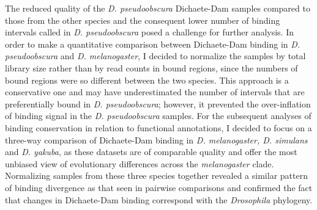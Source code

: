 The reduced quality of the \emph{D. pseudoobscura} Dichaete-Dam samples compared to those from the other species and the consequent lower number of binding intervals called in \emph{D. pseudoobscura} posed a challenge for further analysis. In order to make a quantitative comparison between Dichaete-Dam binding in \emph{D. pseudoobscura} and \emph{D. melanogaster}, I decided to normalize the samples by total library size rather than by read counts in bound regions, since the numbers of bound regions were so different between the two species. This approach is a conservative one and may have underestimated the number of intervals that are preferentially bound in \emph{D. pseudoobscura}; however, it prevented the over-inflation of binding signal in the \emph{D. pseudoobscura} samples. For the subsequent analyses of binding conservation in relation to functional annotations, I decided to focus on a three-way comparison of Dichaete-Dam binding in \emph{D. melanogaster, D. simulans} and \emph{D. yakuba}, as these datasets are of comparable quality and offer the most unbiased view of evolutionary differences across the \emph{melanogaster} clade. Normalizing samples from these three species together revealed a similar pattern of binding divergence as that seen in pairwise comparisons and confirmed the fact that changes in Dichaete-Dam binding correspond with the \emph{Drosophila} phylogeny.\\

